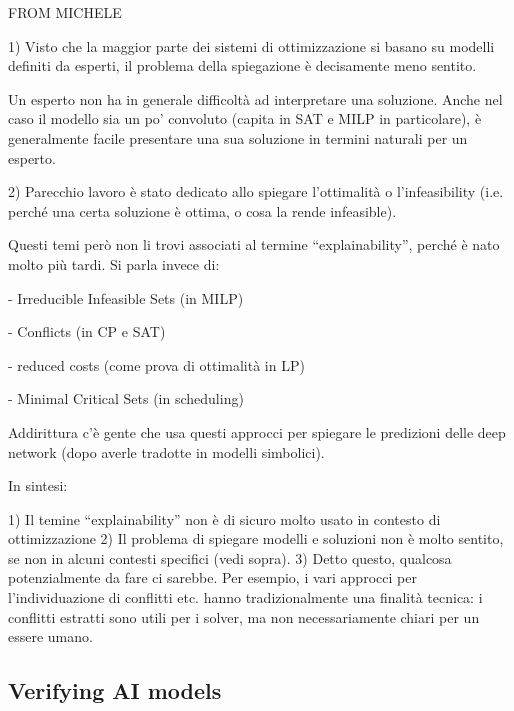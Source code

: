 \begin{description}
    {\color{red}FROM MICHELE \tt

      1) Visto che la maggior parte dei sistemi di ottimizzazione si
      basano su modelli definiti da esperti, il problema della
      spiegazione è decisamente meno sentito.

      Un esperto non ha in generale difficoltà ad interpretare una
      soluzione. Anche nel caso il modello sia un po’ convoluto
      (capita in SAT e MILP in particolare), è generalmente facile
      presentare una sua soluzione in termini naturali per un esperto.

      2) Parecchio lavoro è stato dedicato allo spiegare l’ottimalità
      o l’infeasibility (i.e. perché una certa soluzione è ottima, o
      cosa la rende infeasible).

      Questi temi però non li trovi associati al termine
      “explainability”, perché è nato molto più tardi. Si parla invece
      di:

      - Irreducible Infeasible Sets (in MILP)
      
      - Conflicts (in CP e SAT)
      
      - reduced costs (come  prova di ottimalità in LP)
      
      - Minimal Critical Sets (in scheduling)
      

      Addirittura c’è gente che usa questi approcci per spiegare le
      predizioni delle deep network (dopo averle tradotte in modelli
      simbolici).

In sintesi:

1) Il temine “explainability” non è di sicuro molto usato in contesto di ottimizzazione
2) Il problema di  spiegare modelli e soluzioni non è molto sentito, se non in alcuni contesti specifici (vedi sopra).
3) Detto questo, qualcosa potenzialmente da fare ci sarebbe. Per esempio, i vari approcci per l’individuazione di conflitti etc. hanno tradizionalmente una finalità tecnica: i  conflitti estratti sono utili per i solver, ma non necessariamente chiari per un  essere umano.
    }
  \end{description}
  
\subsection{Verifying AI models}





